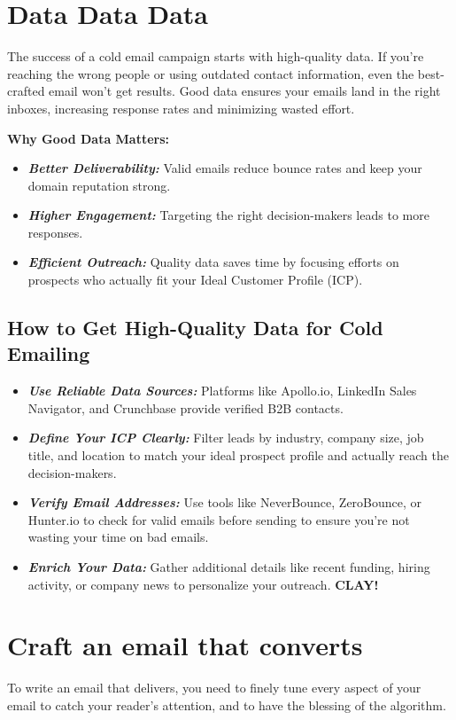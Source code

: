 \documentclass[12pt]{article}
\newcommand{\bb}[1]{\textbf{\textit{#1}}}
\begin{document}
\section{Data Data Data}
The success of a cold email campaign starts with high-quality data. If you’re reaching the wrong people or using outdated contact information, even the best-crafted email won’t get results. Good data ensures your emails land in the right inboxes, increasing response rates and minimizing wasted effort.\par

\textbf{Why Good Data Matters:}
\begin{itemize}
	\item \bb{Better Deliverability:} Valid emails reduce bounce rates and keep your domain reputation strong.
	\item \bb{Higher Engagement:} Targeting the right decision-makers leads to more responses.
	\item \bb{Efficient Outreach:} Quality data saves time by focusing efforts on prospects who actually fit your Ideal Customer Profile (ICP).
\end{itemize}

\subsection*{How to Get High-Quality Data for Cold Emailing}
\begin{itemize}
	\item \bb{Use Reliable Data Sources:} Platforms like Apollo.io, LinkedIn Sales Navigator, and Crunchbase provide verified B2B contacts.
	\item \bb{Define Your ICP Clearly:} Filter leads by industry, company size, job title, and location to match your ideal prospect profile and actually reach the decision-makers.
	\item \bb{Verify Email Addresses:} Use tools like NeverBounce, ZeroBounce, or Hunter.io to check for valid emails before sending to ensure you're not wasting your time on bad emails.
	\item \bb{Enrich Your Data:} Gather additional details like recent funding, hiring activity, or company news to personalize your outreach. \textbf{CLAY!}
\end{itemize}


\section{Craft an email that converts}
To write an email that delivers, you need to finely tune every aspect of your email to catch your reader's attention, and to have the blessing of the algorithm.
\end{document}
